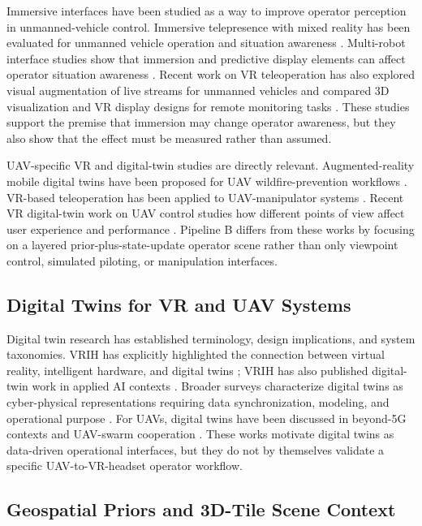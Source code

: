 \documentclass[fleqn]{VRIH2025}
\begin{document}
Immersive interfaces have been studied as a way to improve operator perception in unmanned-vehicle control. Immersive telepresence with mixed reality has been evaluated for unmanned vehicle operation and situation awareness \cite{fabris2021immersive}. Multi-robot interface studies show that immersion and predictive display elements can affect operator situation awareness \cite{roldan2017multirobot}. Recent work on VR teleoperation has also explored visual augmentation of live streams for unmanned vehicles \cite{luo2024visual} and compared 3D visualization and VR display designs for remote monitoring tasks \cite{buchner2025remote}. These studies support the premise that immersion may change operator awareness, but they also show that the effect must be measured rather than assumed.

UAV-specific VR and digital-twin studies are directly relevant. Augmented-reality mobile digital twins have been proposed for UAV wildfire-prevention workflows \cite{costa2025ardigitaltwin}. VR-based teleoperation has been applied to UAV-manipulator systems \cite{yang2025uavmanipulator}. Recent VR digital-twin work on UAV control studies how different points of view affect user experience and performance \cite{vona2025uavdt}. Pipeline B differs from these works by focusing on a layered prior-plus-state-update operator scene rather than only viewpoint control, simulated piloting, or manipulation interfaces.

\subsection{Digital Twins for VR and UAV Systems}

Digital twin research has established terminology, design implications, and system taxonomies. VRIH has explicitly highlighted the connection between virtual reality, intelligent hardware, and digital twins \cite{lv2022vrihdt}; VRIH has also published digital-twin work in applied AI contexts \cite{ahmed2022vrihdt}. Broader surveys characterize digital twins as cyber-physical representations requiring data synchronization, modeling, and operational purpose \cite{jones2020dt,barricelli2019dt,singh2021dt}. For UAVs, digital twins have been discussed in beyond-5G contexts \cite{lv2021uavdt} and UAV-swarm cooperation \cite{lei2021uavswarms}. These works motivate digital twins as data-driven operational interfaces, but they do not by themselves validate a specific UAV-to-VR-headset operator workflow.

\subsection{Geospatial Priors and 3D-Tile Scene Context}
\end{document}
